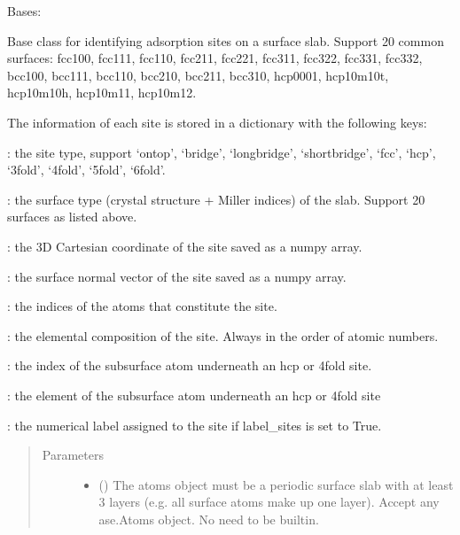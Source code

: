 \documentclass[letterpaper,10pt,english]{sphinxmanual}
\begin{document}
\begin{fulllineitems}
\label{\detokenize{modules:acat.adsorption_sites.SlabAdsorptionSites}}
Bases: 

Base class for identifying adsorption sites on a surface slab.
Support 20 common surfaces: fcc100, fcc111, fcc110, fcc211,
fcc221, fcc311, fcc322, fcc331, fcc332, bcc100, bcc111, bcc110,
bcc210, bcc211, bcc310, hcp0001, hcp10m10t, hcp10m10h,
hcp10m11, hcp10m12.

The information of each site is stored in a dictionary with the
following keys:

: the site type, support ‘ontop’, ‘bridge’, ‘longbridge’,
‘shortbridge’, ‘fcc’, ‘hcp’, ‘3fold’, ‘4fold’, ‘5fold’, ‘6fold’.

: the surface type (crystal structure + Miller indices)
of the slab. Support 20 surfaces as listed above.

: the 3D Cartesian coordinate of the site saved as a
numpy array.

: the surface normal vector of the site saved as a numpy
array.

: the indices of the atoms that constitute the site.

: the elemental composition of the site. Always in
the order of atomic numbers.

: the index of the subsurface atom underneath an
hcp or 4fold site.

: the element of the subsurface atom underneath
an hcp or 4fold site

: the numerical label assigned to the site if label\_sites
is set to True.
\begin{quote}\begin{description}
\item[{Parameters}] \leavevmode\begin{itemize}
\item {} 
 () \textendash{} The atoms object must be a periodic surface slab with at
least 3 layers (e.g. all surface atoms make up one layer).
Accept any ase.Atoms object. No need to be built\sphinxhyphen{}in.


\end{itemize}
\end{description}
\end{quote}
\end{fulllineitems}
\end{document}
